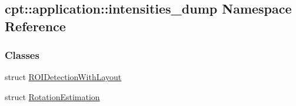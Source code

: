 \hypertarget{namespacecpt_1_1application_1_1intensities__dump}{\subsection{cpt\-:\-:application\-:\-:intensities\-\_\-dump Namespace Reference}
\label{namespacecpt_1_1application_1_1intensities__dump}
}
\subsubsection*{Classes}
\begin{DoxyCompactItemize}
\item 
struct \hyperlink{structcpt_1_1application_1_1intensities__dump_1_1_r_o_i_detection_with_layout}{R\-O\-I\-Detection\-With\-Layout}
\item 
struct \hyperlink{structcpt_1_1application_1_1intensities__dump_1_1_rotation_estimation}{Rotation\-Estimation}
\end{DoxyCompactItemize}
